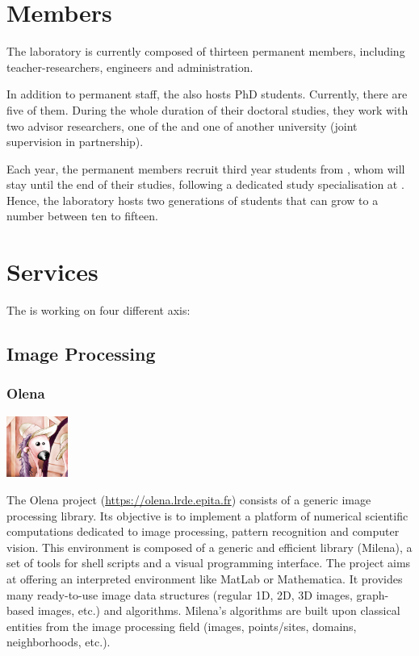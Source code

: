 \section{Members}
The laboratory is currently composed of thirteen permanent members, including teacher-researchers, engineers
and administration.

\noindent In addition to permanent staff, the \LRDE\space also hosts PhD students. Currently, there are five
of them. During the whole duration of their doctoral studies, they work with two advisor researchers, one of
the \LRDE\space and one of another university (joint supervision in partnership).

Each year, the permanent members recruit third year students from \EPITA, whom will stay until the
end of their studies, following a dedicated study specialisation at \EPITA\space. Hence, the laboratory
hosts two generations of students that can grow to a number between ten to fifteen.


\section{Services}
The \LRDE\space is working on four different axis:


\subsection{Image Processing}
\subsubsection{Olena}
\begin{center}
 \includegraphics[width=2cm]{img/olena.jpg}
\end{center}
The Olena project (\url{https://olena.lrde.epita.fr}) consists of a generic image processing library.
Its objective is to implement a platform of numerical scientific computations dedicated to image
processing, pattern recognition and computer vision. This environment is composed of a generic and
efficient library (Milena), a set of tools for shell scripts and a visual programming interface.
The project aims at offering an interpreted environment like MatLab or Mathematica. It provides many
ready-to-use image data structures (regular 1D, 2D, 3D images, graph-based images, etc.) and algorithms.
Milena's algorithms are built upon classical entities from the image processing field (images, points/sites,
domains, neighborhoods, etc.).\\

